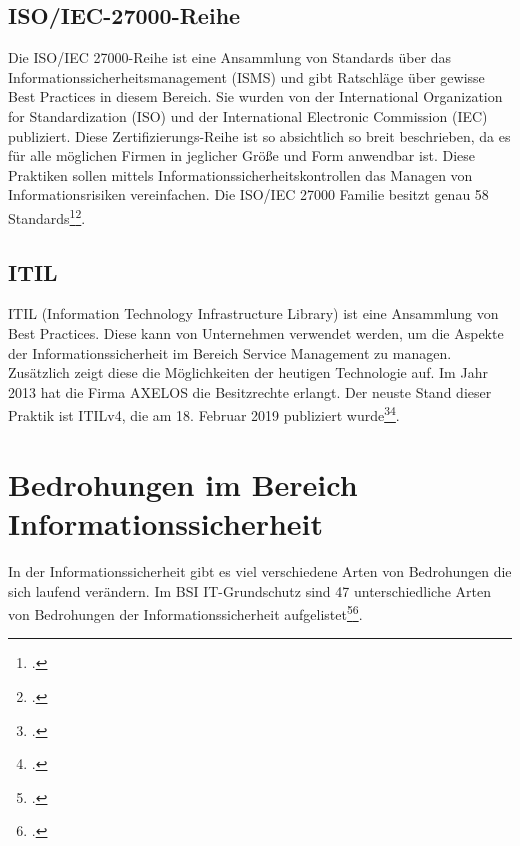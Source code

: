 \subsection{ISO/IEC-27000-Reihe}
Die ISO/IEC 27000-Reihe ist eine Ansammlung von Standards über das Informationssicherheitsmanagement (ISMS) und gibt Ratschläge über gewisse Best Practices in diesem Bereich. Sie wurden von der International Organization for Standardization (ISO) und der International Electronic Commission (IEC) publiziert. 
Diese Zertifizierungs-Reihe ist so absichtlich so breit beschrieben, da es für alle möglichen Firmen in jeglicher Größe und Form anwendbar ist.
Diese Praktiken sollen mittels Informationssicherheitskontrollen das Managen von Informationsrisiken vereinfachen. Die ISO/IEC 27000 Familie besitzt genau 58 Standards\footcite{iso-reihe-wiki}\footcite{iso-reihe-gv}.


\subsection{ITIL}
ITIL (Information Technology Infrastructure Library) ist eine Ansammlung von Best Practices. Diese kann von Unternehmen verwendet werden, um die Aspekte der Informationssicherheit im Bereich Service Management zu managen. Zusätzlich zeigt diese die Möglichkeiten der heutigen Technologie auf. Im Jahr 2013 hat die Firma AXELOS die Besitzrechte erlangt.
Der neuste Stand dieser Praktik ist ITILv4, die am 18. Februar 2019 publiziert wurde\footcite{Lehrunterlagen-HTL-cloud}\footcite{itil}.


\section{Bedrohungen im Bereich Informationssicherheit}
In der Informationssicherheit gibt es viel verschiedene Arten von Bedrohungen die sich laufend verändern. Im BSI IT-Grundschutz sind 47 unterschiedliche Arten von Bedrohungen der Informationssicherheit aufgelistet\footcite{Lehrunterlagen-HTL-cloud}\footcite{bedrohungen}.


